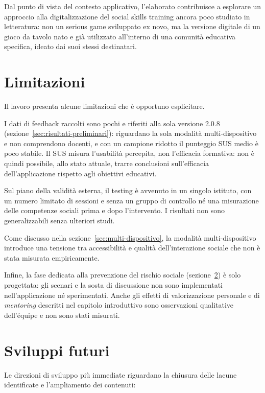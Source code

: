 \documentclass[12pt]{report}
\begin{document}
Dal punto di vista del contesto applicativo, l'elaborato contribuisce a esplorare un approccio alla digitalizzazione del social skills training ancora poco studiato in letteratura: non un serious game sviluppato ex novo, ma la versione digitale di un gioco da tavolo nato e già utilizzato all'interno di una comunità educativa specifica, ideato dai suoi stessi destinatari.

\section{Limitazioni}

Il lavoro presenta alcune limitazioni che è opportuno esplicitare.

I dati di feedback raccolti sono pochi e riferiti alla sola versione 2.0.8 (sezione~\ref{sec:risultati-preliminari}): riguardano la sola modalità multi-dispositivo e non comprendono docenti, e con un campione ridotto il punteggio SUS medio è poco stabile. Il SUS misura l'usabilità percepita, non l'efficacia formativa: non è quindi possibile, allo stato attuale, trarre conclusioni sull'efficacia dell'applicazione rispetto agli obiettivi educativi.

Sul piano della validità esterna, il testing è avvenuto in un singolo istituto, con un numero limitato di sessioni e senza un gruppo di controllo né una misurazione delle competenze sociali prima e dopo l'intervento. I risultati non sono generalizzabili senza ulteriori studi.

Come discusso nella sezione~\ref{sec:multi-dispositivo}, la modalità multi-dispositivo introduce una tensione tra accessibilità e qualità dell'interazione sociale che non è stata misurata empiricamente.

Infine, la fase dedicata alla prevenzione del rischio sociale (sezione~\ref{sec:sviluppi-futuri}) è solo progettata: gli scenari e la sosta di discussione non sono implementati nell'applicazione né sperimentati. Anche gli effetti di valorizzazione personale e di \textit{mentoring} descritti nel capitolo introduttivo sono osservazioni qualitative dell'équipe e non sono stati misurati.

\section{Sviluppi futuri}
\label{sec:sviluppi-futuri}

Le direzioni di sviluppo più immediate riguardano la chiusura delle lacune identificate e l'ampliamento dei contenuti:
\end{document}
